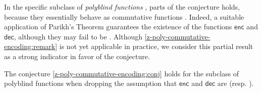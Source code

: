 In the specific subclass of \emph{polyblind functions}
\cite{nguyn21comparison,doueneau2022hiding}, parts of the conjecture holds,
because they essentially behave as commutative functions \cite[Theorem
6.12]{gaetanphd}. Indeed, a suitable application of Parikh's Theorem
\cite{parikh66context} guarantees the existence of the functions $\mathsf{enc}$
and $\mathsf{dec}$, although they may fail to be  .
Although \cref{z-poly-commutative-encoding:remark} is not yet applicable in
practice, we consider this partial result as a strong indicator in favor of the
conjecture.

\begin{remark}
    \label{z-poly-commutative-encoding:remark}
    The conjecture \cref{z-poly-commutative-encoding:conj} holds for the
    subclass of polyblind functions when dropping the assumption that
    $\mathsf{enc}$ and $\mathsf{dec}$ are 
    (resp. ).
\end{remark}
